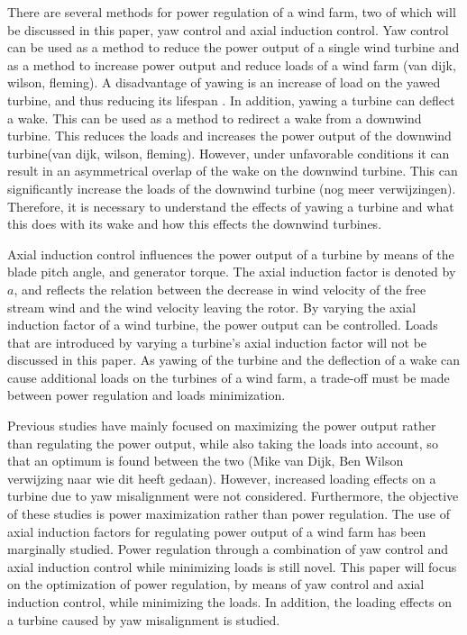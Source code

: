 There are several methods for power regulation of a wind farm, two of which will be discussed in this paper, yaw control and axial induction control. Yaw control can be used as a method to reduce the power output of a single wind turbine and as a method to increase power output and reduce loads of a wind farm (van dijk, wilson, fleming). A disadvantage of yawing is an increase of load on the yawed turbine, and thus reducing its lifespan \cite{Zalkind2016,Kanev2017}. In addition, yawing a turbine can deflect a wake. This can be used as a method to redirect a wake from a downwind turbine. This reduces the loads and increases the power output of the downwind turbine(van dijk, wilson, fleming). However, under unfavorable conditions it can result in an asymmetrical overlap of the wake on the downwind turbine. This can significantly increase the loads of the downwind turbine \cite{Wilson2017,Dijk2016}(nog meer verwijzingen). Therefore, it is necessary to understand the effects of yawing a turbine and what this does with its wake and how this effects the downwind turbines. 

Axial induction control influences the power output of a turbine by means of the blade pitch angle, and generator torque. The axial induction factor is denoted by $a$, and reflects the relation between the decrease in wind velocity of the free stream wind and the wind velocity leaving the rotor. By varying the axial induction factor of a wind turbine, the power output can be controlled. Loads that are introduced by varying a turbine's axial induction factor will not be discussed in this paper. 
As yawing of the turbine and the deflection of a wake can cause additional loads on the turbines of a wind farm, a trade-off must be made between power regulation and loads minimization.

Previous studies have mainly focused on maximizing the power output rather than regulating the power output, while also taking the loads into account, so that an optimum is found between the two (Mike van Dijk, Ben Wilson verwijzing naar wie dit heeft gedaan). However, increased loading effects on a turbine due to yaw misalignment were not considered. Furthermore, the objective of these studies is power maximization rather than power regulation. The use of axial induction factors for regulating power output of a wind farm has been marginally studied. Power regulation through a combination of yaw control and axial induction control while minimizing loads is still novel. This paper will focus on the optimization of power regulation, by means of yaw control and axial induction control, while minimizing the loads. In addition, the loading effects on a turbine caused by yaw misalignment is studied. 


